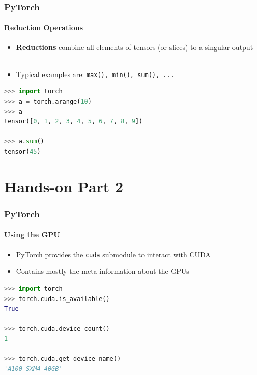 \documentclass[aspectratio=1610]{beamer}
\begin{document}
\begin{frame}[fragile]
    \frametitle{PyTorch}
    \framesubtitle{Reduction Operations}
    
    \begin{itemize}
        \item \textbf{Reductions} combine all elements of tensors (or slices) to a singular output\\~
        \item Typical examples are: \texttt{max(), min(), sum(), ...}
    \end{itemize}
    \vspace{1em}
    \begin{lstlisting}[language=Python]
>>> import torch
>>> a = torch.arange(10)
>>> a
tensor([0, 1, 2, 3, 4, 5, 6, 7, 8, 9])

>>> a.sum()
tensor(45)
    \end{lstlisting}
\end{frame}

\section{Hands-on Part 2}

\begin{frame}[fragile]
    \frametitle{PyTorch}
    \framesubtitle{Using the GPU}

    \begin{itemize}
        \item PyTorch provides the \texttt{cuda} submodule to interact with CUDA
        \item Contains mostly the meta-information about the GPUs
    \end{itemize}
    \vspace{1em}
    \begin{lstlisting}[language=Python]
>>> import torch
>>> torch.cuda.is_available()
True

>>> torch.cuda.device_count()
1

>>> torch.cuda.get_device_name()
'A100-SXM4-40GB'
    \end{lstlisting}
\end{frame}
\end{document}

